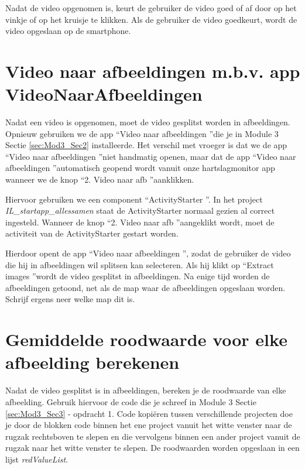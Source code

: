Nadat de video opgenomen is, keurt de gebruiker de video goed of af door op het vinkje of op het kruisje te klikken. Als de gebruiker de video goedkeurt, wordt de video opgeslaan op de smartphone.

\section{Video naar afbeeldingen m.b.v. app VideoNaarAfbeeldingen}
\label{sec:Mod5_Sec2}
%
Nadat een video is opgenomen, moet de video gesplitst worden in afbeeldingen. Opnieuw gebruiken we de app \textquotedblleft Video naar afbeeldingen \textquotedblright die je in Module 3 Sectie \ref{sec:Mod3_Sec2} installeerde. Het verschil met vroeger is dat we de app \textquotedblleft Video naar afbeeldingen \textquotedblright niet handmatig openen, maar dat de app \textquotedblleft Video naar afbeeldingen \textquotedblright automatisch geopend wordt vanuit onze hartslagmonitor app wanneer we de knop \textquotedblleft 2. Video naar afb \textquotedblright aanklikken.

Hiervoor gebruiken we een component \textquotedblleft ActivityStarter \textquotedblright. In het project \emph{IL\_startapp\_allessamen} staat de ActivityStarter normaal gezien al correct ingesteld. Wanneer de knop \textquotedblleft 2. Video naar afb \textquotedblright aangeklikt wordt, moet de activiteit van de ActivityStarter gestart worden. 

Hierdoor opent de app \textquotedblleft Video naar afbeeldingen \textquotedblright, zodat de gebruiker de video die hij in afbeeldingen wil splitsen kan selecteren. Als hij klikt op \textquotedblleft Extract images \textquotedblright wordt de video gesplitst in afbeeldingen. Na enige tijd worden de afbeeldingen getoond, net als de map waar de afbeeldingen opgeslaan worden. Schrijf ergens neer welke map dit is.

\section{Gemiddelde roodwaarde voor elke afbeelding berekenen}
\label{sec:Mod5_Sec3}
%
Nadat de video gesplitst is in afbeeldingen, bereken je de roodwaarde van elke afbeelding. Gebruik hiervoor de code die je schreef in Module 3 Sectie \ref{sec:Mod3_Sec3} - opdracht 1. Code kopi\"eren tussen verschillende projecten doe je door de blokken code binnen het ene project vanuit het witte venster naar de rugzak rechtsboven te slepen en die vervolgens binnen een ander project vanuit de rugzak naar het witte venster te slepen. De roodwaarden worden opgeslaan in een lijst \emph{redValueList}. 

